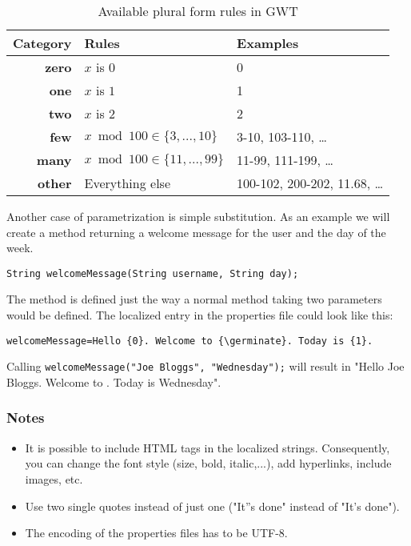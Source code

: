 \begin{table}
    \centering
    \caption{Available plural form rules in GWT}
    \label{tab:examples_plural_form}
    \begin{tabular}{rll}
	    \toprule
	    \textbf{Category} & \textbf{Rules} & \textbf{Examples}\\
	    \midrule
	    \textbf{zero} & $x$ is $0$ & 0\\
	    \textbf{one} & $x$ is $1$ & 1\\
	    \textbf{two} & $x$ is $2$ & 2\\
	    \textbf{few} & $x \bmod 100 \in \{3,...,10\}$ & 3-10, 103-110, \dots\\
	    \textbf{many} & $x \bmod 100 \in \{11,...,99\}$ & 11-99, 111-199, \dots\\
	    \textbf{other} & Everything else & 100-102, 200-202, 11.68, \dots\\
	    \bottomrule
    \end{tabular}
\end{table}

Another case of parametrization is simple substitution. As an example we will create a method returning a welcome message for the user and the day of the week.

\begin{lstlisting}[style=Java]
String welcomeMessage(String username, String day);
\end{lstlisting}
\noindent
The method is defined just the way a normal method taking two parameters would be defined. The localized entry in the properties file could look like this:

\begin{lstlisting}[style=Properties]
welcomeMessage=Hello {0}. Welcome to {\germinate}. Today is {1}.
\end{lstlisting}
\noindent
Calling \texttt{welcomeMessage("Joe Bloggs", "Wednesday");} will result in "Hello Joe Bloggs. Welcome to {\germinate}. Today is Wednesday".

\subsubsection{Notes}
\begin{itemize}
    \item It is possible to include HTML tags in the localized strings. Consequently, you can change the font style (size, bold, italic,...), add hyperlinks, include images, etc.
    \item Use two single quotes instead of just one (\eg "It''s done" instead of "It's done").
    \item The encoding of the properties files has to be UTF-8.
\end{itemize}

